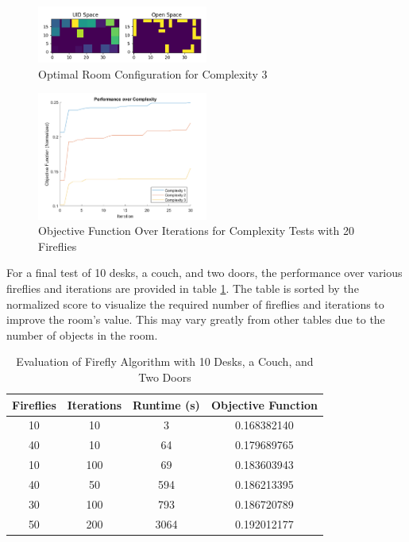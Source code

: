 \documentclass[sigconf,authordraft]{acmart}
\begin{document}
\begin{figure}
    \centering
    \includegraphics[width=0.5\textwidth]{conor3.png}
    \caption{Optimal Room Configuration for Complexity 3}
    \label{complex3}
\end{figure}

\begin{figure}
    \centering
    \includegraphics[width=0.5\textwidth]{conor_complex_plot.png}
    \caption{Objective Function Over Iterations for Complexity Tests with 20 Fireflies}
    \label{complex_plot}
\end{figure}

For a final test of 10 desks, a couch, and two doors, the performance over various fireflies and iterations are provided in table \ref{final_table}. The table is sorted by the normalized score to visualize the required number of fireflies and iterations to improve the room’s value. This may vary greatly from other tables due to the number of objects in the room. 

\begin{table}
    \centering
    \caption{Evaluation of Firefly Algorithm with 10 Desks, a Couch, and Two Doors}
    \label{final_table}
    \begin{tabular}{|c|c|c|c|}
        \hline
        \textbf{Fireflies} & \textbf{Iterations} & \textbf{Runtime (s)} & \textbf{Objective Function} \\
        \hline
        10 & 10 & 3 & 0.168382140 \\
        40 & 10 & 64 & 0.179689765 \\
        10 & 100 & 69 & 0.183603943 \\
        40 & 50 & 594 & 0.186213395 \\
        30 & 100 & 793 & 0.186720789 \\
        50 & 200 & 3064 & 0.192012177 \\
        \hline
    \end{tabular}
\end{table}
\end{document}
